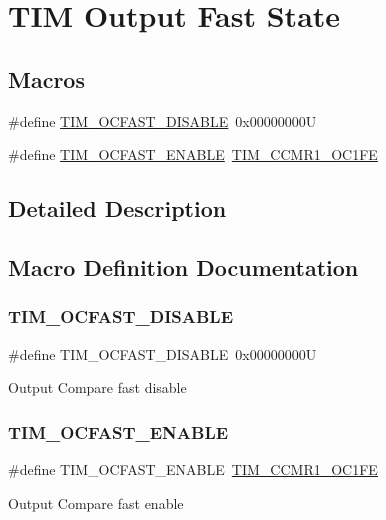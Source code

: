 \hypertarget{group___t_i_m___output___fast___state}{}\section{T\+IM Output Fast State}
\label{group___t_i_m___output___fast___state}
\subsection*{Macros}
\begin{DoxyCompactItemize}
\item 
\#define \mbox{\hyperlink{group___t_i_m___output___fast___state_ga71429b63f2a6604171ccfd3a91ccf43a}{T\+I\+M\+\_\+\+O\+C\+F\+A\+S\+T\+\_\+\+D\+I\+S\+A\+B\+LE}}~0x00000000U
\item 
\#define \mbox{\hyperlink{group___t_i_m___output___fast___state_ga445a2c0633ac649e816cf7a16b716d61}{T\+I\+M\+\_\+\+O\+C\+F\+A\+S\+T\+\_\+\+E\+N\+A\+B\+LE}}~\mbox{\hyperlink{group___peripheral___registers___bits___definition_gab9c5878e85ce02c22d8a374deebd1b6e}{T\+I\+M\+\_\+\+C\+C\+M\+R1\+\_\+\+O\+C1\+FE}}
\end{DoxyCompactItemize}


\subsection{Detailed Description}


\subsection{Macro Definition Documentation}
\mbox{\label{group___t_i_m___output___fast___state_ga71429b63f2a6604171ccfd3a91ccf43a}} 
\subsubsection{\texorpdfstring{TIM\_OCFAST\_DISABLE}{TIM\_OCFAST\_DISABLE}}
{\footnotesize\ttfamily \#define T\+I\+M\+\_\+\+O\+C\+F\+A\+S\+T\+\_\+\+D\+I\+S\+A\+B\+LE~0x00000000U}

Output Compare fast disable \mbox{\label{group___t_i_m___output___fast___state_ga445a2c0633ac649e816cf7a16b716d61}} 
\subsubsection{\texorpdfstring{TIM\_OCFAST\_ENABLE}{TIM\_OCFAST\_ENABLE}}
{\footnotesize\ttfamily \#define T\+I\+M\+\_\+\+O\+C\+F\+A\+S\+T\+\_\+\+E\+N\+A\+B\+LE~\mbox{\hyperlink{group___peripheral___registers___bits___definition_gab9c5878e85ce02c22d8a374deebd1b6e}{T\+I\+M\+\_\+\+C\+C\+M\+R1\+\_\+\+O\+C1\+FE}}}

Output Compare fast enable 